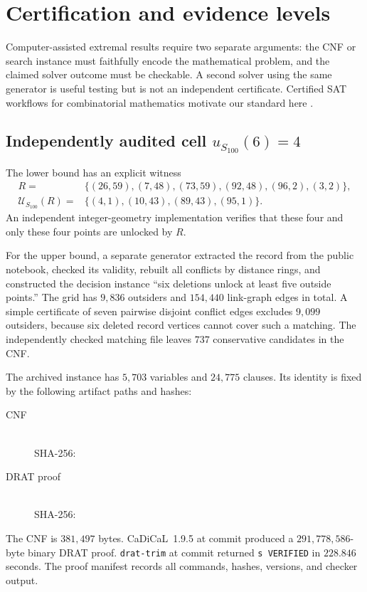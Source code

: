 \documentclass[11pt]{article}
\theoremstyle{definition}
\theoremstyle{remark}
\newcommand{\calU}{\mathcal{U}}
\begin{document}
\section{Certification and evidence levels}
\label{sec:certification}

Computer-assisted extremal results require two separate arguments: the CNF or
search instance must faithfully encode the mathematical problem, and the
claimed solver outcome must be checkable.  A second solver using the same
generator is useful testing but is not an independent certificate.  Certified
SAT workflows for combinatorial mathematics motivate our standard here
\cite{heule2016pythagorean,cruzfilipe2017rat,szeider2026lratcatcher}.

\subsection{Independently audited cell
\texorpdfstring{$u_{S_{100}}(6)=4$}{uS100(6)=4}}

The lower bound has an explicit witness
\begin{align*}
R={}&\{(26,59),(7,48),(73,59),(92,48),(96,2),(3,2)\},\\
\calU_{S_{100}}(R)={}&\{(4,1),(10,43),(89,43),(95,1)\}.
\end{align*}
An independent integer-geometry implementation verifies that these four and
only these four points are unlocked by $R$.

For the upper bound, a separate generator extracted the record from the public
notebook, checked its validity, rebuilt all conflicts by distance rings, and
constructed the decision instance ``six deletions unlock at least five outside
points.''  The grid has $9{,}836$ outsiders and $154{,}440$ link-graph edges in
total.  A simple certificate of seven pairwise disjoint conflict edges excludes
$9{,}099$ outsiders, because six deleted record vertices cannot cover such a
matching.  The independently checked matching file leaves $737$ conservative
candidates in the CNF.

The archived instance has $5{,}703$ variables and $24{,}775$ clauses.  Its
identity is fixed by the following artifact paths and hashes:
\begin{description}
\item[CNF]
\\
SHA-256:
\item[DRAT proof]
\\
SHA-256:
\end{description}
The CNF is $381{,}497$ bytes.  CaDiCaL~1.9.5 at commit
 produced a
$291{,}778{,}586$-byte binary DRAT proof.  \texttt{drat-trim} at commit
 returned
\texttt{s VERIFIED} in $228.846$ seconds.  The proof manifest records all
commands, hashes, versions, and checker output.
\end{document}
